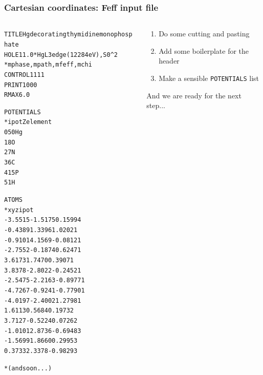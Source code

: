 \documentclass[10pt, xcolor=x11names, compress]{beamer}
\begin{document}
\begin{frame}[fragile]
  \frametitle{Cartesian coordinates: Feff input file}
  \begin{columns}
    \begin{column}{0.5\linewidth}
  \begin{alltt}
\tiny
 {\color{Green4}TITLE Hg decorating thymidine monophosphate}
 {\color{Purple2}HOLE}      1   1.0  {\color{Blue4} *  Hg L3 edge (12284 eV), S0^2}
 {\color{Blue4}*         mphase,mpath,mfeff,mchi}
 {\color{SteelBlue2}CONTROL}   1      1     1     1
 {\color{SteelBlue2}PRINT}     1      0     0     0
 {\color{Purple2}RMAX}      6.0

 {\color{Brown4}POTENTIALS}
 {\color{Blue4}*    ipot   Z  element}
        0   50   Hg
        1    8   O
        2    7   N
        3    6   C
        4   15   P
        5    1   H

 {\color{Brown4}ATOMS}
 {\color{Blue4}*   x       y       z    ipot}
   -3.5515   -1.5175    0.1599 4
   -0.4389    1.3396    1.0202 1
   -0.9101    4.1569   -0.0812 1
   -2.7552   -0.1874    0.6247 1
    3.6173    1.7470    0.3907 1
    3.8378   -2.8022   -0.2452 1
   -2.5475   -2.2163   -0.8977 1
   -4.7267   -0.9241   -0.7790 1
   -4.0197   -2.4002    1.2798 1
    1.6113    0.5684    0.1973 2
    3.7127   -0.5224    0.0726 2
   -1.0101    2.8736   -0.6948 3
   -1.5699    1.8660    0.2995 3
    0.3733    2.3378   -0.9829 3

 {\color{Blue4}*   (and so on...)}
  \end{alltt}
    \end{column}
    \begin{column}{0.5\linewidth}
      \begin{enumerate}
      \item Do some cutting and pasting
      \item Add some boilerplate for the header
      \item Make a sensible {\color{Brown4}\texttt{POTENTIALS}} list
      \end{enumerate}

      \bigskip

      And we are ready for the next step...
    \end{column}
  \end{columns}
\end{frame}
\end{document}
